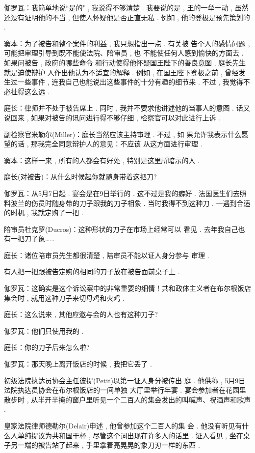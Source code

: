 伽罗瓦：我简单地说“是的" , 我说得不够清楚 . 我要说的是 , 王的一举一动 , 虽然还没有证明他的不当 , 但使人怀疑他是否正直无私 . 例如 , 他的登极是预先策划的 . 

窦本：为了被告和整个案件的利益 , 我只想指出一点 . 有关被 告个人的感情问题 , 可能把审理引导到既不能使法院、陪审员 , 也 不能使任何人感到愉快的方面去 . 如果问被告 , 政府的哪些命令 和行动使得他怀疑国王陛下的善良意图 , 庭长先生就是迫使辩护 人作出他认为不适宜的解释 . 例如 , 在国王陛下登极之前 , 曾经发 生过一些事件 , 连我自己也能说出这些事件的十分有趣的细节来 .  不过 , 我觉得不必扯得这么远 . 

庭长：律师并不处于被告席上 . 同时 , 我并不要求他讲述他的当事人的意图 . 话又说回来 , 如果对被告的讯问进行得不够仔细 ,  检察官可以对此进行上诉 . 

副检察官米勒尔(Miller)：庭长当然应该主持审理 . 不过 , 如 果允许我表示什么愿望的话 , 那我完全同意辩护人的意见：不应该 从这方面进行审理 . 

窦本：这样一来 , 所有的人都会有好处 , 特别是这里所暗示的人 . 

庭长(对被告)：从什么时候起你就随身带着这把刀?

伽罗瓦：从5月7日起 . 宴会是在9日举行的 . 这不过是我的癖好 . 法国医生们去照料波兰的伤员时随身带的刀子跟我的刀子相象 . 当时我得不到这种刀 . 一遇到合适的时机 , 我就定购了一把 . 

陪审员杜克罗(Ducros)：这种形状的刀子在市场上经常可以 看见 . 去年我自己也有一把刀子象……

庭长：诸位陪审员先生都很清楚 , 陪审员不能以证人身分参与 审理 . 

有人把一把跟被告定购的相同的刀子放在被告面前桌子上 . 

伽罗瓦：这确实是这个诉讼案中的非常重要的细情！共和政体主义者在布尔根饭店集会时 , 就用这种刀子来切母鸡和火鸡 . 

庭长：这么说来 , 其他应邀与会的人也有这种刀子?

伽罗瓦：他们只使用我的 . 

庭长：你的刀子后来怎么啦?

伽罗瓦：那天晚上离开饭店的时候 , 我把它丢了 . 

初级法院执达员协会主任彼提(Petit)以第一证人身分被传出 庭 . 他供称 , 5月9日法院执达员协会在布尔根饭店的一间单独 大厅里举行年宴 . 宴会参加者在花园里散步时 , 从半开半掩的窗户里听见一个二百人的集会发出的叫喊声、祝酒声和歌声 . 

皇家法院律师德勒尔(Delair)申述 , 他曾参加这个二百人的集 会 . 他没有听见有什么人单纯提议为共和国干杯 , 尽管这个词出现在许多人的话里 . 证人看见 , 坐在桌子另一端的被告站了起来 ,  手里拿着亮晃晃的象刀刃一样的东西 . 

